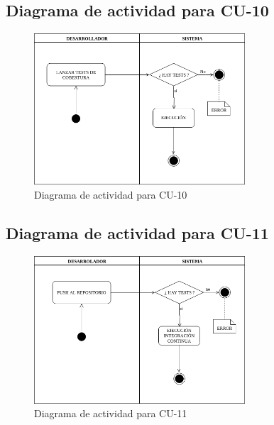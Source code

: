 \subsection{Diagrama de actividad para CU-10 }
\begin{figure}[H]
  \begin{center}
    \includegraphics[width=0.7\textwidth]{imagenes/DA-CU-10.png}
    \caption{Diagrama de actividad para CU-10}
    \label{fig:DA-CU-10}
  \end{center}
\end{figure}
\subsection{Diagrama de actividad para CU-11 }
\begin{figure}[H]
  \begin{center}
    \includegraphics[width=0.7\textwidth]{imagenes/DA-CU-11.png}
    \caption{Diagrama de actividad para CU-11}
    \label{fig:DA-CU-11}
  \end{center}
\end{figure}

